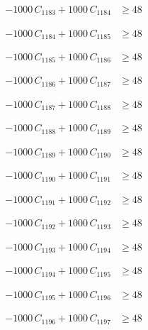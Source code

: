 \documentclass[a4paper,11pt]{article}
\begin{document}
\begin{align}
-1000\,C_{1183} + 1000\,C_{1184} &\geq 48 \nonumber
\end{align}

\begin{align}
-1000\,C_{1184} + 1000\,C_{1185} &\geq 48 \nonumber
\end{align}

\begin{align}
-1000\,C_{1185} + 1000\,C_{1186} &\geq 48 \nonumber
\end{align}

\begin{align}
-1000\,C_{1186} + 1000\,C_{1187} &\geq 48 \nonumber
\end{align}

\begin{align}
-1000\,C_{1187} + 1000\,C_{1188} &\geq 48 \nonumber
\end{align}

\begin{align}
-1000\,C_{1188} + 1000\,C_{1189} &\geq 48 \nonumber
\end{align}

\begin{align}
-1000\,C_{1189} + 1000\,C_{1190} &\geq 48 \nonumber
\end{align}

\begin{align}
-1000\,C_{1190} + 1000\,C_{1191} &\geq 48 \nonumber
\end{align}

\begin{align}
-1000\,C_{1191} + 1000\,C_{1192} &\geq 48 \nonumber
\end{align}

\begin{align}
-1000\,C_{1192} + 1000\,C_{1193} &\geq 48 \nonumber
\end{align}

\begin{align}
-1000\,C_{1193} + 1000\,C_{1194} &\geq 48 \nonumber
\end{align}

\begin{align}
-1000\,C_{1194} + 1000\,C_{1195} &\geq 48 \nonumber
\end{align}

\begin{align}
-1000\,C_{1195} + 1000\,C_{1196} &\geq 48 \nonumber
\end{align}

\begin{align}
-1000\,C_{1196} + 1000\,C_{1197} &\geq 48 \nonumber
\end{align}
\end{document}
